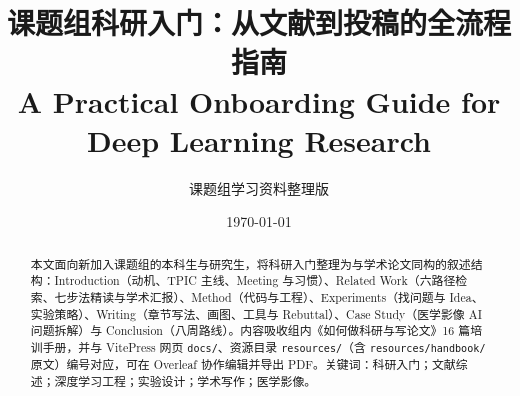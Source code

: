 \documentclass[UTF8,a4paper,11pt,fontset=fandol]{ctexart}
\title{\textbf{课题组科研入门：从文献到投稿的全流程指南}\\[0.4em]
\large A Practical Onboarding Guide for Deep Learning Research}
\author{课题组学习资料整理版}
\date{\today}
\begin{document}
\maketitle

\begin{abstract}
\noindent
本文面向新加入课题组的本科生与研究生，将科研入门整理为与学术论文同构的叙述结构：Introduction（动机、TPIC 主线、Meeting 与习惯）、Related Work（六路径检索、七步法精读与学术汇报）、Method（代码与工程）、Experiments（找问题与 Idea、实验策略）、Writing（章节写法、画图、工具与 Rebuttal）、Case Study（医学影像 AI 问题拆解）与 Conclusion（八周路线）。内容吸收组内《如何做科研与写论文》16 篇培训手册，并与 VitePress 网页 \texttt{docs/}、资源目录 \texttt{resources/}（含 \texttt{resources/handbook/} 原文）编号对应，可在 Overleaf 协作编辑并导出 PDF。关键词：科研入门；文献综述；深度学习工程；实验设计；学术写作；医学影像。
\end{abstract}

\tableofcontents
\newpage








\appendix

\end{document}
